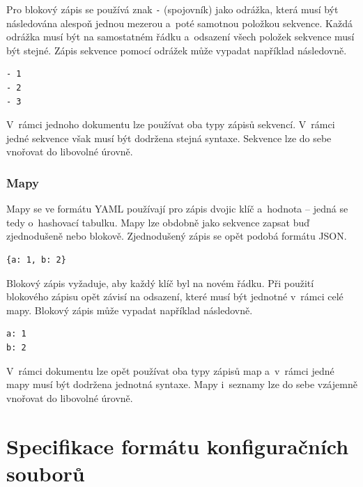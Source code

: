 \documentclass[FM,bw,DP]{tulthesis}
\begin{document}
Pro blokový zápis se používá znak \texttt{-} (spojovník) jako odrážka, která musí být následována alespoň jednou mezerou a~poté samotnou položkou sekvence. Každá odrážka musí být na samostatném řádku a~odsazení všech položek sekvence musí být stejné. Zápis sekvence pomocí odrážek může vypadat například následovně.

\vspace{5pt}
\begin{lstlisting}
- 1
- 2
- 3
\end{lstlisting}
\vspace*{-20pt}

V~rámci jednoho dokumentu lze používat oba typy zápisů sekvencí. V~rámci jedné sekvence však musí být dodržena stejná syntaxe. Sekvence lze do sebe vnořovat do libovolné úrovně.

\subsubsection*{Mapy}

Mapy se ve formátu \gls{YAML} používají pro zápis dvojic klíč a~hodnota -- jedná se tedy o~hashovací tabulku. Mapy lze obdobně jako sekvence zapsat buď zjednodušeně nebo blokově. Zjednodušený zápis se opět podobá formátu \gls{JSON}.

\vspace{5pt}
\begin{lstlisting}
{a: 1, b: 2}
\end{lstlisting}
\vspace*{-20pt}

Blokový zápis vyžaduje, aby každý klíč byl na novém řádku. Při použití blokového zápisu opět závisí na odsazení, které musí být jednotné v~rámci celé mapy. Blokový zápis může vypadat například následovně.

\vspace{5pt}
\begin{lstlisting}
a: 1
b: 2
\end{lstlisting}
\vspace*{-20pt}

V~rámci dokumentu lze opět používat oba typy zápisů map a~v~rámci jedné mapy musí být dodržena jednotná syntaxe. Mapy i~seznamy lze do sebe vzájemně vnořovat do libovolné úrovně.

\section{Specifikace formátu konfiguračních souborů}
\end{document}
